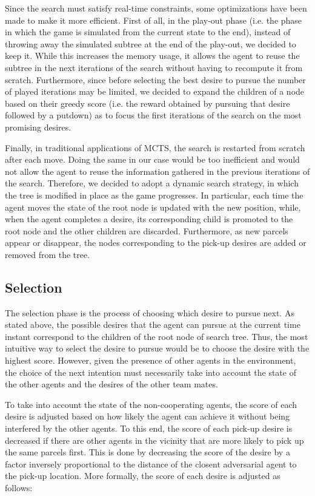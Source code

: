 Since the search must satisfy real-time constraints, some optimizations have been made to make it more efficient. First of all, in the play-out phase (i.e. the phase in which the game is simulated from the current state to the end), instead of throwing away the simulated subtree at the end of the play-out, we decided to keep it. While this increases the memory usage, it allows the agent to reuse the subtree in the next iterations of the search without having to recompute it from scratch. Furthermore, since before selecting the best desire to pursue the number of played iterations may be limited, we decided to expand the children of a node based on their greedy score (i.e. the reward obtained by pursuing that desire followed by a putdown) as to focus the first iterations of the search on the most promising desires.

Finally, in traditional applications of MCTS, the search is restarted from scratch after each move. Doing the same in our case would be too inefficient and would not allow the agent to reuse the information gathered in the previous iterations of the search. Therefore, we decided to adopt a dynamic search strategy, in which the tree is modified in place as the game progresses. In particular, each time the agent moves the state of the root node is updated with the new position, while, when the agent completes a desire, its corresponding child is promoted to the root node and the other children are discarded. Furthermore, as new parcels appear or disappear, the nodes corresponding to the pick-up desires are added or removed from the tree.

\subsection{Selection}
\label{sec:selection}

The selection phase is the process of choosing which desire to pursue next. As stated above, the possible desires that the agent can pursue at the current time instant correspond to the children of the root node of search tree. Thus, the most intuitive way to select the desire to pursue would be to choose the desire with the highest score. However, given the presence of other agents in the environment, the choice of the next intention must necessarily take into account the state of the other agents and the desires of the other team mates.

To take into account the state of the non-cooperating agents, the score of each desire is adjusted based on how likely the agent can achieve it without being interfered by the other agents. To this end, the score of each pick-up desire is decreased if there are other agents in the vicinity that are more likely to pick up the same parcels first. This is done by decreasing the score of the desire by a factor inversely proportional to the distance of the closent adversarial agent to the pick-up location. More formally, the score of each desire is adjusted as follows:

